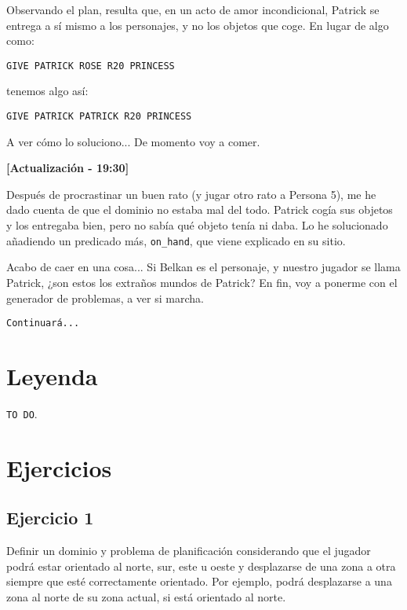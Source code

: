 \documentclass[11pt,a4paper]{article}
\begin{document}
\medskip

Observando el plan, resulta que, en un acto de amor incondicional, Patrick se entrega a sí mismo a los personajes, y no los
objetos que coge. En lugar de algo como:

\medskip
\begin{center}
\texttt{GIVE PATRICK ROSE R20 PRINCESS}
\end{center}

\medskip

tenemos algo así:

\medskip
\begin{center}
\texttt{GIVE PATRICK PATRICK R20 PRINCESS}
\end{center}

\medskip

A ver cómo lo soluciono... De momento voy a comer.

\bigskip

\textbf{[Actualización - 19:30]}

Después de procrastinar un buen rato (y jugar otro rato a Persona 5), me he dado cuenta de que el dominio no
estaba mal del todo. Patrick cogía sus objetos y los entregaba bien, pero no sabía qué objeto tenía ni daba.
Lo he solucionado añadiendo un predicado más, \texttt{on\_hand}, que viene explicado en su sitio.

\medskip

Acabo de caer en una cosa... Si Belkan es el personaje, y nuestro jugador se llama Patrick, 
¿son estos los extraños mundos de Patrick? 
En fin, voy a ponerme con el generador de problemas, a ver si marcha. 

\medskip

\texttt{Continuará...}

\section{Leyenda}

\texttt{TO DO}.

\section{Ejercicios}

\subsection{Ejercicio 1}

Definir  un  dominio y  problema de  planificación considerando  que  el  jugador podrá    estar  orientado  al  norte,  sur,  este  u  oeste  y  desplazarse  de  una  zona  a  otra siempre  que  esté  correctamente  orientado.  Por  ejemplo,  podrá  desplazarse  a  una zona  al  norte  de  su  zona  actual,  si  está  orientado  al  norte.
\end{document}
